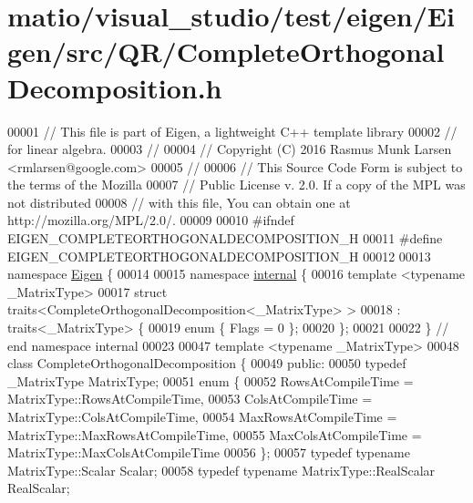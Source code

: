 \hypertarget{matio_2visual__studio_2test_2eigen_2_eigen_2src_2_q_r_2_complete_orthogonal_decomposition_8h_source}{}\section{matio/visual\+\_\+studio/test/eigen/\+Eigen/src/\+Q\+R/\+Complete\+Orthogonal\+Decomposition.h}
\label{matio_2visual__studio_2test_2eigen_2_eigen_2src_2_q_r_2_complete_orthogonal_decomposition_8h_source}

\begin{DoxyCode}
00001 \textcolor{comment}{// This file is part of Eigen, a lightweight C++ template library}
00002 \textcolor{comment}{// for linear algebra.}
00003 \textcolor{comment}{//}
00004 \textcolor{comment}{// Copyright (C) 2016 Rasmus Munk Larsen <rmlarsen@google.com>}
00005 \textcolor{comment}{//}
00006 \textcolor{comment}{// This Source Code Form is subject to the terms of the Mozilla}
00007 \textcolor{comment}{// Public License v. 2.0. If a copy of the MPL was not distributed}
00008 \textcolor{comment}{// with this file, You can obtain one at http://mozilla.org/MPL/2.0/.}
00009 
00010 \textcolor{preprocessor}{#ifndef EIGEN\_COMPLETEORTHOGONALDECOMPOSITION\_H}
00011 \textcolor{preprocessor}{#define EIGEN\_COMPLETEORTHOGONALDECOMPOSITION\_H}
00012 
00013 \textcolor{keyword}{namespace }\hyperlink{namespace_eigen}{Eigen} \{
00014 
00015 \textcolor{keyword}{namespace }\hyperlink{namespaceinternal}{internal} \{
00016 \textcolor{keyword}{template} <\textcolor{keyword}{typename} \_MatrixType>
00017 \textcolor{keyword}{struct }traits<CompleteOrthogonalDecomposition<\_MatrixType> >
00018     : traits<\_MatrixType> \{
00019   \textcolor{keyword}{enum} \{ Flags = 0 \};
00020 \};
00021 
00022 \}  \textcolor{comment}{// end namespace internal}
00023 
00047 \textcolor{keyword}{template} <\textcolor{keyword}{typename} \_MatrixType>
00048 \textcolor{keyword}{class }CompleteOrthogonalDecomposition \{
00049  \textcolor{keyword}{public}:
00050   \textcolor{keyword}{typedef} \_MatrixType MatrixType;
00051   \textcolor{keyword}{enum} \{
00052     RowsAtCompileTime = MatrixType::RowsAtCompileTime,
00053     ColsAtCompileTime = MatrixType::ColsAtCompileTime,
00054     MaxRowsAtCompileTime = MatrixType::MaxRowsAtCompileTime,
00055     MaxColsAtCompileTime = MatrixType::MaxColsAtCompileTime
00056   \};
00057   \textcolor{keyword}{typedef} \textcolor{keyword}{typename} MatrixType::Scalar Scalar;
00058   \textcolor{keyword}{typedef} \textcolor{keyword}{typename} MatrixType::RealScalar RealScalar;

\end{DoxyCode}
